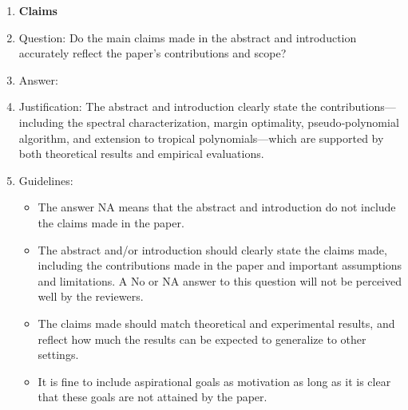 \documentclass{article}
\begin{document}
\begin{enumerate}

\item {\bf Claims}
    \item[] Question: Do the main claims made in the abstract and introduction accurately reflect the paper's contributions and scope?
    \item[] Answer: \answerYes{}
    \item[] Justification: The abstract and introduction clearly state the contributions—including the spectral characterization, margin optimality, pseudo‐polynomial algorithm, and extension to tropical polynomials—which are supported by both theoretical results and empirical evaluations.
    \item[] Guidelines:
    \begin{itemize}
        \item The answer NA means that the abstract and introduction do not include the claims made in the paper.
        \item The abstract and/or introduction should clearly state the claims made, including the contributions made in the paper and important assumptions and limitations. A No or NA answer to this question will not be perceived well by the reviewers. 
        \item The claims made should match theoretical and experimental results, and reflect how much the results can be expected to generalize to other settings. 
        \item It is fine to include aspirational goals as motivation as long as it is clear that these goals are not attained by the paper. 
    \end{itemize}


\end{enumerate}
\end{document}
